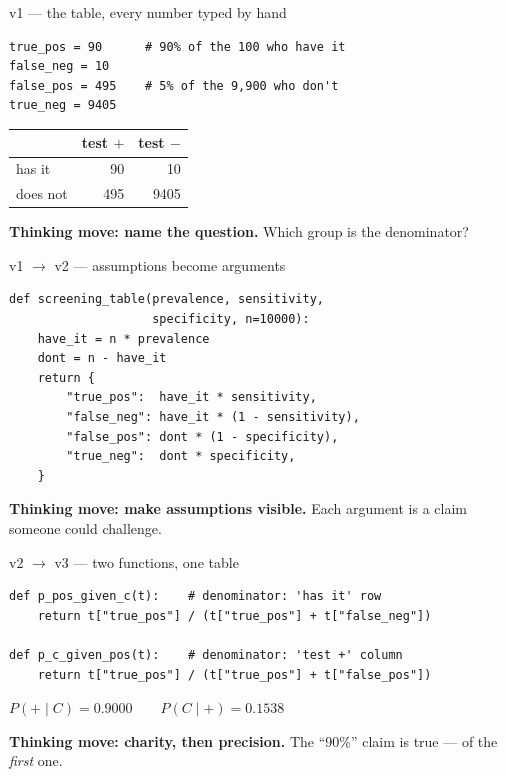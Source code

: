 \documentclass[aspectratio=169,10pt]{beamer}
\begin{document}
\begin{frame}[fragile]{v1 --- the table, every number typed by hand}
\begin{lstlisting}
true_pos = 90      # 90% of the 100 who have it
false_neg = 10
false_pos = 495    # 5% of the 9,900 who don't
true_neg = 9405
\end{lstlisting}
\begin{center}
\begin{tabular}{l|r|r}
 & test $+$ & test $-$ \\ \hline
has it & 90 & 10 \\
does not & 495 & 9405 \\
\end{tabular}
\end{center}
\textbf{Thinking move: name the question.} Which group is the denominator?
\end{frame}

\begin{frame}[fragile]{v1 $\to$ v2 --- assumptions become arguments}
\begin{lstlisting}
def screening_table(prevalence, sensitivity,
                    specificity, n=10000):
    have_it = n * prevalence
    dont = n - have_it
    return {
        "true_pos":  have_it * sensitivity,
        "false_neg": have_it * (1 - sensitivity),
        "false_pos": dont * (1 - specificity),
        "true_neg":  dont * specificity,
    }
\end{lstlisting}
\textbf{Thinking move: make assumptions visible.} Each argument is a claim someone could challenge.
\end{frame}

\begin{frame}[fragile]{v2 $\to$ v3 --- two functions, one table}
\begin{lstlisting}
def p_pos_given_c(t):    # denominator: 'has it' row
    return t["true_pos"] / (t["true_pos"] + t["false_neg"])

def p_c_given_pos(t):    # denominator: 'test +' column
    return t["true_pos"] / (t["true_pos"] + t["false_pos"])
\end{lstlisting}
\begin{center}
$P(+\mid C)=0.9000\qquad P(C\mid +)=0.1538$
\end{center}
\textbf{Thinking move: charity, then precision.} The ``90\%'' claim is true --- of the \emph{first} one.
\end{frame}
\end{document}
